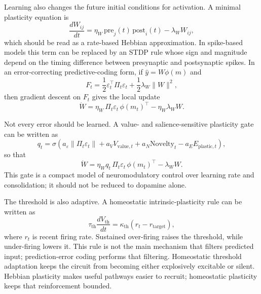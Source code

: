 \documentclass[11pt, a4paper]{article}
\begin{document}
Learning also changes the future initial conditions for activation. A minimal plasticity equation is
\begin{equation}
\frac{dW_{ij}}{dt}
=
\eta_W\,\mathrm{pre}_j(t)\,\mathrm{post}_i(t)
-
\lambda_W W_{ij},
\end{equation}
which should be read as a rate-based Hebbian approximation. In spike-based models this term can be replaced by an STDP rule whose sign and magnitude depend on the timing difference between presynaptic and postsynaptic spikes. In an error-correcting predictive-coding form, if $\hat y=W\phi(m)$ and
\begin{equation}
F_t
=
\frac{1}{2}\varepsilon_t^\top\Pi_t\varepsilon_t
+
\frac{1}{2}\lambda_W\lVert W\rVert^2,
\end{equation}
then gradient descent on $F_t$ gives the local update
\begin{equation}
\dot W
=
\eta_W\,\Pi_t\varepsilon_t\,\phi(m_t)^\top
-
\eta_W\lambda_W W.
\end{equation}

Not every error should be learned. A value- and salience-sensitive plasticity gate can be written as
\begin{equation}
q_t
=
\sigma\left(
a_\varepsilon\lVert\Pi_t\varepsilon_t\rVert
+
a_VV_{\mathrm{value},t}
+
a_N\mathrm{Novelty}_t
-
a_EE_{\mathrm{plastic},t}
\right),
\end{equation}
so that
\begin{equation}
\dot W
=
\eta_W q_t\,\Pi_t\varepsilon_t\,\phi(m_t)^\top
-
\lambda_W W.
\end{equation}
This gate is a compact model of neuromodulatory control over learning rate and consolidation; it should not be reduced to dopamine alone.

The threshold is also adaptive. A homeostatic intrinsic-plasticity rule can be written as
\begin{equation}
\tau_{\mathrm{th}}
\frac{dV_{\mathrm{th}}}{dt}
=
\kappa_{\mathrm{th}}
\left(
r_t-r_{\mathrm{target}}
\right),
\end{equation}
where $r_t$ is recent firing rate. Sustained over-firing raises the threshold, while under-firing lowers it. This rule is not the main mechanism that filters predicted input; prediction-error coding performs that filtering. Homeostatic threshold adaptation keeps the circuit from becoming either explosively excitable or silent. Hebbian plasticity makes useful pathways easier to recruit; homeostatic plasticity keeps that reinforcement bounded.
\end{document}
